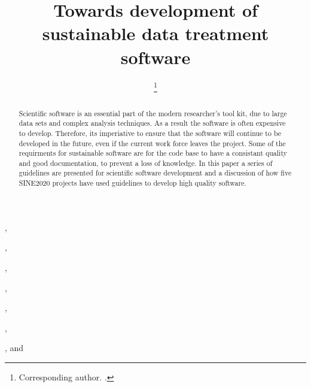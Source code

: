 \documentclass[jnr]{iosart2x}
\begin{document}
\begin{frontmatter}

\title{Towards development of sustainable data treatment software}

\author[A]{ %
\thanks{Corresponding author. .}},
\author[A]{ },
\author[A]{ },
\author[B]{ },
\author[C]{ },
\author[D]{ },
\author[A]{ },
and
\author[E]{ }

\address[A]{,}
\address[B]{,}
\address[C]{,}
\address[D]{,}
\address[E]{,}

\begin{abstract}
Scientific software is an essential part of the modern researcher's tool kit, due to large data sets and complex analysis techniques. 
As a result the software is often expensive to develop. 
Therefore, its imperiative to ensure that the software will continue to be developed in the future, even if the current work force leaves the project. 
Some of the requirments for sustainable software are for the code base to have a consistant quality and good documentation, to prevent a loss of knowledge. 
In this paper a series of guidelines are presented for scientific software development and a discussion of how five SINE2020 projects have used guidelines to develop high quality software.

\end{abstract}

\begin{keyword}
\end{keyword}

\end{frontmatter}
\end{document}
